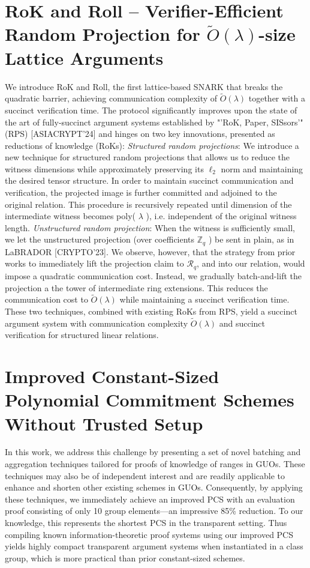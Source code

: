 \documentclass[11pt]{article}
\theoremstyle{definition}
\theoremstyle{remark}
\theoremstyle{plain}
\begin{document}
\section{\cite{cryptoeprint:2025/1220} {RoK} and Roll – Verifier-Efficient Random Projection for $\tilde{O}(\lambda)$-size Lattice Arguments}
We introduce RoK and Roll, the first lattice-based SNARK that breaks the quadratic barrier, achieving communication complexity of $\tilde{O}(\lambda)$ together with a succinct verification time. The protocol significantly improves upon the state of the art of fully-succinct argument systems established by "'RoK, Paper, SISsors'" (RPS) [ASIACRYPT'24] and hinges on two key innovations, presented as reductions of knowledge (RoKs): \emph{Structured random projections}: We introduce a new technique for structured random projections that allows us to reduce the witness dimensions while approximately preserving its $\ell_2$ norm and maintaining the desired tensor structure. In order to maintain succinct communication and verification, the projected image is further committed and adjoined to the original relation. This procedure is recursively repeated until dimension of the intermediate witness becomes poly( $\lambda$ ), i.e. independent of the original witness length. \emph{Unstructured random projection}: When the witness is sufficiently small, we let the unstructured projection (over coefficients $\mathbb{Z}_q$ ) be sent in plain, as in LaBRADOR [CRYPTO'23]. We observe, however, that the strategy from prior works to immediately lift the projection claim to $\mathcal{R}_q$, and into our relation, would impose a quadratic communication cost. Instead, we gradually batch-and-lift the projection a the tower of intermediate ring extensions. This reduces the communication cost to $\tilde{O}(\lambda)$ while maintaining a succinct verification time. These two techniques, combined with existing RoKs from RPS, yield a succinct argument system with communication complexity $\tilde{O}(\lambda)$ and succinct verification for structured linear relations.

\section{\cite{cryptoeprint:2025/1233} Improved Constant-Sized Polynomial Commitment Schemes Without Trusted Setup}
In this work, we address this challenge by presenting a set of novel batching and aggregation techniques tailored for proofs of knowledge of ranges in GUOs. These techniques may also be of independent interest and are readily applicable to enhance and shorten other existing schemes in GUOs. Consequently, by applying these techniques, we immediately achieve an improved PCS with an evaluation proof consisting of only 10 group elements---an impressive 85\% reduction. To our knowledge, this represents the shortest PCS in the transparent setting. Thus compiling known information-theoretic proof systems using our improved PCS yields highly compact transparent argument systems when instantiated in a class group, which is more practical than prior constant-sized schemes.
\end{document}
